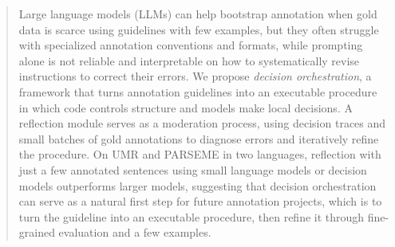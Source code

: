 \begin{abstract}
Large language models (LLMs) can help bootstrap annotation when gold data is scarce using guidelines with few examples, but they often struggle with specialized annotation conventions and formats, while prompting alone is not reliable and interpretable on how to systematically revise instructions to correct their errors.
We propose \emph{decision orchestration}, a framework that turns annotation guidelines into an executable procedure in which code controls structure and models make local decisions.
A reflection module serves as a moderation process, using decision traces and small batches of gold annotations to diagnose errors and iteratively refine the procedure. On UMR and PARSEME in two languages, reflection with just a few annotated sentences using small language models or decision models outperforms larger models, suggesting that decision orchestration can serve as a natural first step for future annotation projects, which is to turn the guideline into an executable procedure, then refine it through fine-grained evaluation and a few examples.

\end{abstract}